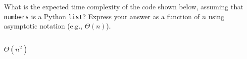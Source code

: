 \begin{prob}
    What is the expected time complexity of the code shown below, assuming that
    \texttt{numbers} is a Python \texttt{list}? Express your answer as a function
    of $n$ using asymptotic notation (e.g., $\Theta(n)$).

    \inputminted[lastline=12]{python}{./code.py}

    \begin{soln}
        $\Theta(n^2)$
    \end{soln}

\end{prob}
